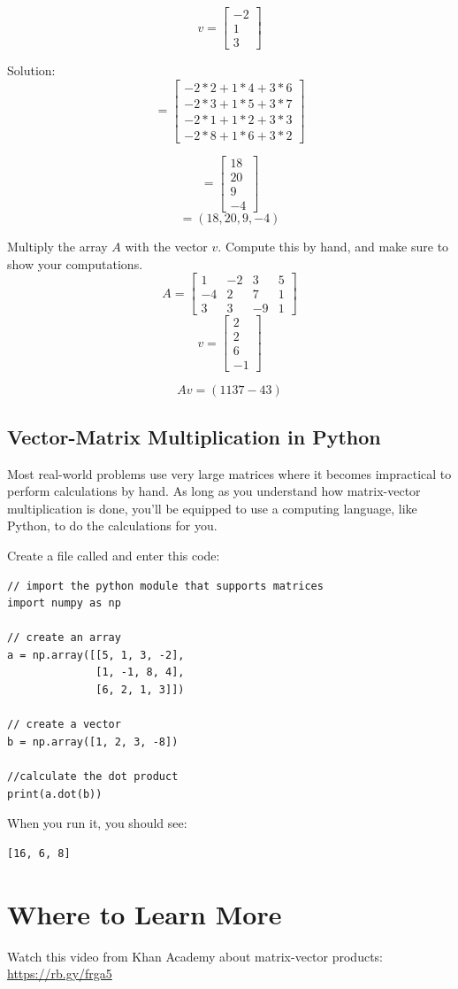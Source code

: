 $$v = \begin{bmatrix}
 -2  \\
 1 \\
 3 
\end{bmatrix}$$

Solution:
$$= \begin{bmatrix}
-2*2+1*4+3*6\\
-2*3+1*5+3*7\\
 -2*1+1*2+3*3\\
-2*8+1*6+3*2
\end{bmatrix}$$

$$= \begin{bmatrix}
18 \\
20\\
9\\
-4 
\end{bmatrix}$$
$$= (18,20,9,-4)$$

\begin{Exercise}[title={Vector Matrix Multiplication}, label=vector-matrix-multiply01]
Multiply the array $A$ with the vector $v$. Compute this by hand, and make sure to show your computations. 
$$A = \begin{bmatrix}
1 & -2  & 3 & 5  \\
-4  & 2  & 7 & 1 \\
3  & 3  & -9 & 1
\end{bmatrix}$$
	$$v = 
	\begin{bmatrix}
		2 \\
 		2 \\
 		6 \\
 		-1
	\end{bmatrix}$$
\end{Exercise}
\begin{Answer}[ref=vector-matrix-multiply01]
$$Av = (11 37 -43)$$
\end{Answer}

\subsection{Vector-Matrix Multiplication in Python}
Most real-world problems use very large matrices where it becomes impractical to perform calculations by hand. As long as you understand how matrix-vector multiplication is done, you'll be equipped to use a computing language, like Python, to do the calculations for you. 

Create a file called  and enter this code:

\begin{Verbatim}
// import the python module that supports matrices
import numpy as np

// create an array
a = np.array([[5, 1, 3, -2], 
              [1, -1, 8, 4], 
              [6, 2, 1, 3]])

// create a vector 
b = np.array([1, 2, 3, -8])

//calculate the dot product
print(a.dot(b))
\end{Verbatim}

When you run it, you should see:
\begin{Verbatim}
[16, 6, 8]
\end{Verbatim}

\section{Where to Learn More}
Watch this video from Khan Academy about matrix-vector products: \url{https://rb.gy/frga5}

